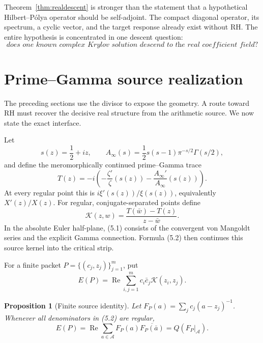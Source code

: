 \documentclass[11pt]{article}
\newtheorem{proposition}[theorem]{Proposition}
\theoremstyle{definition}
\theoremstyle{remark}
\newcommand{\cA}{\mathcal A}
\newcommand{\cK}{\mathcal K}
\newcommand{\Rea}{\operatorname{Re}}
\begin{document}
Theorem~\ref{thm:realdescent} is stronger than the statement that a hypothetical Hilbert--P\'olya
operator should be self-adjoint.  The compact diagonal operator, its spectrum, a cyclic vector,
and the target response already exist without RH.  The entire hypothesis is concentrated in one
descent question:
\[
 \textit{does one known complex Krylov solution descend to the real coefficient field?}
\]

\section{Prime--Gamma source realization}

The preceding sections use the divisor to expose the geometry.  A route toward RH must recover
the decisive real structure from the arithmetic source.  We now state the exact interface.

Let
\[
 s(z)=\frac12+iz,
 \qquad
 A_\infty(s)=\frac12s(s-1)\pi^{-s/2}\Gamma(s/2),
\]
and define the meromorphically continued prime--Gamma trace
\begin{equation}
 T(z)=-i\left(-\frac{\zeta'}{\zeta}(s(z))
                   -\frac{A_\infty'}{A_\infty}(s(z))\right).
                                                               \tag{5.1}
\end{equation}
At every regular point this is $i\xi'(s(z))/\xi(s(z))$, equivalently $X'(z)/X(z)$.
For regular, conjugate-separated points define
\begin{equation}
 \cK(z,w)=\frac{T(\bar w)-T(z)}{z-\bar w}.                \tag{5.2}
\end{equation}
In the absolute Euler half-plane, (5.1) consists of the convergent von Mangoldt series and the
explicit Gamma connection.  Formula (5.2) then continues this source kernel into the critical
strip.

For a finite packet $P=\{(c_j,z_j)\}_{j=1}^m$, put
\begin{equation}
 E(P)=\Rea\sum_{i,j=1}^m c_i\bar c_j\cK(z_i,z_j).         \tag{5.3}
\end{equation}

\begin{proposition}[Finite source identity]
\label{prop:source}
Let $F_P(a)=\sum_jc_j(a-z_j)^{-1}$.  Whenever all denominators in (5.2) are regular,
\begin{equation}
 E(P)=\Rea\sum_{a\in\cA}F_P(a)\overline{F_P(\bar a)}
     =Q(F_P|_{\cA}).                                     \tag{5.4}
\end{equation}
\end{proposition}
\end{document}
